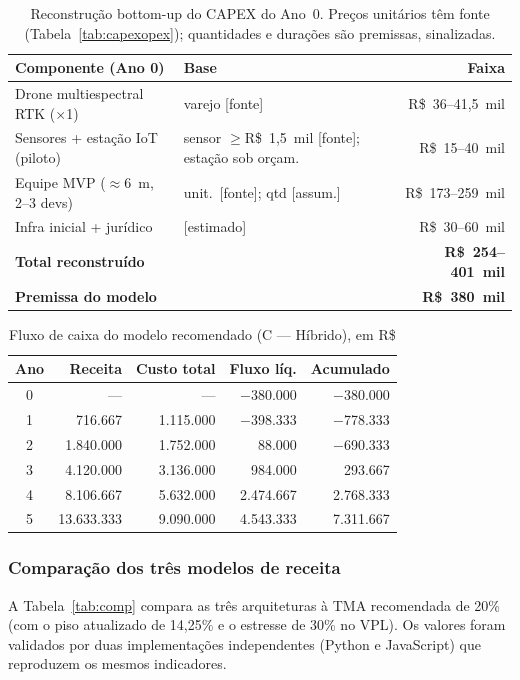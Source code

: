 \documentclass[conference]{IEEEtran}
\newcommand{\rs}{R\$}
\begin{document}
\begin{table}[!t]
\caption{Reconstrução bottom-up do CAPEX do Ano~0. Preços unitários têm fonte (Tabela~\ref{tab:capexopex}); quantidades e durações são premissas, sinalizadas.}
\label{tab:bottomup}
\centering
\footnotesize
\begin{tabular}{@{}llr@{}}
\toprule
\textbf{Componente (Ano 0)} & \textbf{Base} & \textbf{Faixa} \\
\midrule
Drone multiespectral RTK ($\times$1) & varejo [fonte] & \rs~36--41,5~mil \\
Sensores + estação IoT (piloto) & sensor $\geq$\rs~1,5~mil [fonte]; estação sob orçam. & \rs~15--40~mil \\
Equipe MVP ($\approx$6~m, 2--3 devs) & unit.\ [fonte]; qtd [assum.] & \rs~173--259~mil \\
Infra inicial + jurídico & [estimado] & \rs~30--60~mil \\
\midrule
\textbf{Total reconstruído} & & \textbf{\rs~254--401~mil} \\
\textbf{Premissa do modelo} & & \textbf{\rs~380~mil} \\
\bottomrule
\end{tabular}
\end{table}

\begin{table}[!t]
\caption{Fluxo de caixa do modelo recomendado (C --- Híbrido), em \rs}
\label{tab:fc}
\centering
\footnotesize
\begin{tabular}{@{}crrrr@{}}
\toprule
\textbf{Ano} & \textbf{Receita} & \textbf{Custo total} & \textbf{Fluxo líq.} & \textbf{Acumulado} \\
\midrule
0 & --- & --- & $-$380.000 & $-$380.000 \\
1 & 716.667 & 1.115.000 & $-$398.333 & $-$778.333 \\
2 & 1.840.000 & 1.752.000 & 88.000 & $-$690.333 \\
3 & 4.120.000 & 3.136.000 & 984.000 & 293.667 \\
4 & 8.106.667 & 5.632.000 & 2.474.667 & 2.768.333 \\
5 & 13.633.333 & 9.090.000 & 4.543.333 & 7.311.667 \\
\bottomrule
\end{tabular}
\end{table}

\subsubsection{Comparação dos três modelos de receita}
A Tabela~\ref{tab:comp} compara as três arquiteturas à TMA recomendada de 20\% (com o piso atualizado de 14,25\% e o estresse de 30\% no VPL). Os valores foram validados por duas implementações independentes (Python e JavaScript) que reproduzem os mesmos indicadores.
\end{document}
